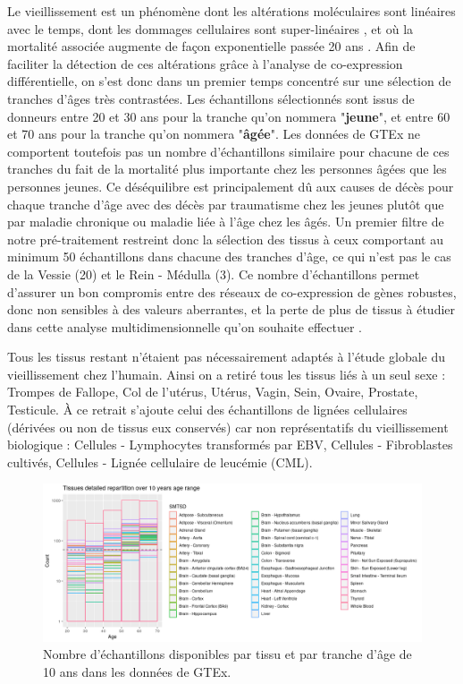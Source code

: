 Le vieillissement est un phénomène dont les altérations moléculaires sont linéaires avec le temps, dont les dommages cellulaires sont super-linéaires , et où la mortalité associée augmente de façon exponentielle passée 20 ans . Afin de faciliter la détection de ces altérations grâce à l'analyse de co-expression différentielle, on s'est donc dans un premier temps concentré sur une sélection de tranches d'âges très contrastées. Les échantillons sélectionnés sont issus de donneurs entre 20 et 30 ans pour la tranche qu'on nommera "\textbf{jeune}", et entre 60 et 70 ans pour la tranche qu'on nommera "\textbf{âgée}". Les données de GTEx ne comportent toutefois pas un nombre d'échantillons similaire pour chacune de ces tranches du fait de la mortalité plus importante chez les personnes âgées que les personnes jeunes. Ce déséquilibre est principalement dû aux causes de décès pour chaque tranche d'âge avec des décès par traumatisme chez les jeunes plutôt que par maladie chronique ou maladie liée à l'âge chez les âgés. Un premier filtre de notre pré-traitement restreint donc la sélection des tissus à ceux comportant au minimum 50 échantillons dans chacune des tranches d'âge, ce qui n'est pas le cas de la Vessie (20) et le Rein - Médulla (3). Ce nombre d'échantillons permet d'assurer un bon compromis entre des réseaux de co-expression de gènes robustes, donc non sensibles à des valeurs aberrantes, et la perte de plus de tissus à étudier dans cette analyse multidimensionnelle qu'on souhaite effectuer .

Tous les tissus restant n'étaient pas nécessairement adaptés à l'étude globale du vieillissement chez l'humain. Ainsi on a retiré tous les tissus liés à un seul sexe : Trompes de Fallope, Col de l'utérus, Utérus, Vagin, Sein, Ovaire, Prostate, Testicule. À ce retrait s'ajoute celui des échantillons de lignées cellulaires (dérivées ou non de tissus eux conservés) car non représentatifs du vieillissement biologique : Cellules - Lymphocytes transformés par EBV, Cellules - Fibroblastes cultivés, Cellules - Lignée cellulaire de leucémie (CML). 


\begin{figure}[ht]
    \centering
    \includegraphics[width=1\textwidth]{img/chap2/chap2_sample_count_by_tissu.png}
    \caption{Nombre d'échantillons disponibles par tissu et par tranche d'âge de 10 ans dans les données de GTEx.}
    \label{figure:sample_count_by_tissu}
\end{figure}


